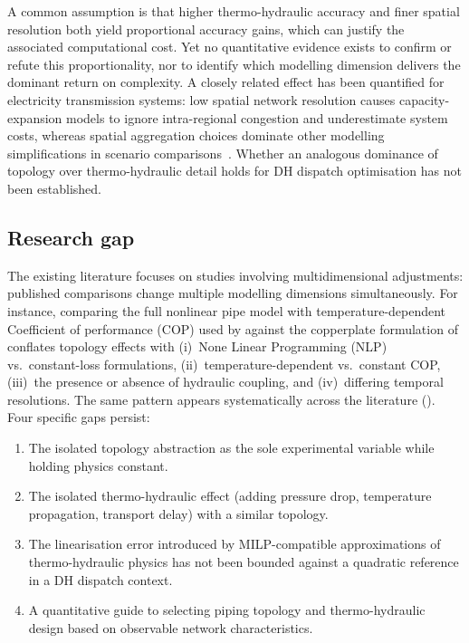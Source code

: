 \documentclass[a4paper,fleqn]{cas-dc}
\begin{document}
A common assumption is that higher thermo-hydraulic accuracy and finer spatial resolution both yield proportional accuracy
gains, which can justify the associated computational cost. Yet no quantitative evidence exists to confirm or refute this
proportionality, nor to identify which modelling dimension delivers
the dominant return on complexity. A closely related effect has
been quantified for electricity transmission systems: low
spatial network resolution causes capacity-expansion models to
ignore intra-regional congestion and underestimate system costs,
whereas spatial aggregation choices dominate other modelling
simplifications in scenario comparisons~\cite{Frysztacki2021,
FrewJacobson2016}. Whether an analogous dominance of topology over
thermo-hydraulic detail holds for DH dispatch optimisation  has not been established.

\subsection{Research gap}
\label{sec:gap}

The existing literature focuses on studies involving multidimensional adjustments: published comparisons change
multiple modelling dimensions simultaneously. For instance,
comparing the full nonlinear pipe model with temperature-dependent
Coefficient of performance (COP) used by \citet{Vesterlund2017} against the
copperplate formulation of \citet{Gabrielli2018}
conflates topology effects with (i)~None Linear Programming (NLP) vs.\ constant-loss
formulations, (ii)~temperature-dependent vs.\ constant COP,
(iii)~the presence or absence of hydraulic coupling, and
(iv)~differing temporal resolutions. The same pattern appears
systematically across the literature
(). Four specific gaps persist:
%
\begin{enumerate}[nosep]
  \item The isolated topology abstraction as the sole
        experimental variable while holding physics constant.
  \item The isolated thermo-hydraulic effect (adding
        pressure drop, temperature propagation, transport delay)
        with a similar topology.
  \item The linearisation error introduced by MILP-compatible
        approximations of thermo-hydraulic physics has not been
        bounded against a quadratic reference in a DH dispatch
        context.
  \item A quantitative guide to selecting piping topology and
        thermo-hydraulic design based on observable network characteristics.
\end{enumerate}
\end{document}
